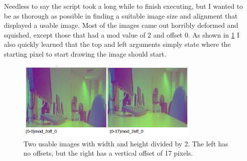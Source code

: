 {{Needless to say the script took a long while to finish executing, but I wanted to be as thorough as possible in finding a suitable image size and alignment that displayed a usable image. Most of the images came out horribly deformed and squished, except those that had a mod value of 2 and offset 0. As shown in \cref{fig:shell1} I also quickly learned that the top and left arguments simply state where the starting pixel to start drawing the image should start.
\begin{figure}[H]
	\begin{center}
		\includegraphics[width=0.8\textwidth]{../images/qpix/shell1}
	\end{center}
	\vspace{-20pt}
	\caption{Two usable images with width and height divided by 2. The left has no offsets, but the right has a vertical offset of 17 pixels. }
	\label{fig:shell1}
	\vspace{-30pt}
\end{figure}

}}
